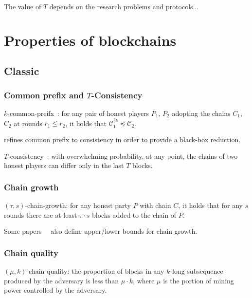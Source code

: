 \documentclass[runningheads]{llncs}
\begin{document}
The value of $T$ depends on the research problems and protocols...






\section{Properties of blockchains}

\subsection{Classic}

\subsubsection{Common prefix and $T$-Consistency}
$k$-common-preifx~\cite{garay2015bitcoin}:
for any pair of honest players $P_1$, $P_2$ adopting the chains $C_1$, $C_2$ at rounds $r_1 \leq r_2$, it holds that $\mathcal{C}_{1}^{\lceil k} \preceq \mathcal{C}_2$.

\cite{pass2017analysis} refines common prefix to consistency in order to provide a black-box reduction.

$T$-consistency~\cite{pass2017analysis}:
with overwhelming probability, at any point, the chains of two honest players can differ only in the last $T$ blocks.

\subsubsection{Chain growth}
$(\tau, s)$-chain-growth:
for any honest party $P$ with chain $C$, it holds that for any $s$ rounds there are at least $\tau \cdot s$ blocks added to the chain of $P$.

Some papers~\cite{rocket2018snowflake}~\cite{pass2017sleepy} also define upper/lower bounds for chain growth.

\subsubsection{Chain quality}
$(\mu, k)$-chain-quality: the proportion of blocks in any $k$-long subsequence produced by the adversary is less than $\mu \cdot k$, where $\mu$ is the portion of mining power controlled by the adversary.






\end{document}
